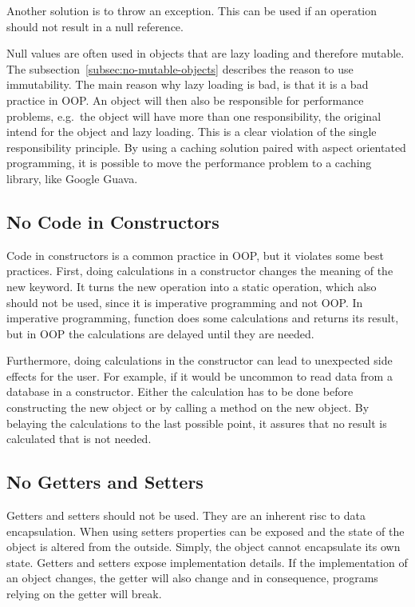 Another solution is to throw an exception.
This can be used if an operation should not result in a null reference.

Null values are often used in objects that are lazy loading and therefore mutable.
The subsection\ \ref{subsec:no-mutable-objects} describes the reason to use immutability.
The main reason why lazy loading is bad, is that it is a bad practice in \gls{OOP}.
An object will then also be responsible for performance problems, e.g.\ the object will have more than one responsibility,
the original intend for the object and lazy loading.
This is a clear violation of the single responsibility principle.
By using a caching solution paired with aspect orientated programming, it is possible to move the performance problem to a caching library, like Google Guava.\cite{elegant-objects}

\subsection{No Code in Constructors}\label{subsec:no-code-in-constructors}
Code in constructors is a common practice in \gls{OOP}, but it violates some best practices.
First, doing calculations in a constructor changes the meaning of the new keyword.
It turns the new operation into a static operation, which also should not be used, since it is imperative programming and not \gls{OOP}.
In imperative programming, function does some calculations and returns its result, but in \gls{OOP} the calculations are delayed until they are needed.

Furthermore, doing calculations in the constructor can lead to unexpected side effects for the user.
For example, if it would be uncommon to read data from a database in a constructor.
Either the calculation has to be done before constructing the new object or by calling a method on the new object.
By belaying the calculations to the last possible point, it assures that no result is calculated that is not needed.\cite{elegant-objects}

\subsection{No Getters and Setters}\label{subsec:no-getters-and-setters}
Getters and setters should not be used.
They are an inherent risc to data encapsulation.
When using setters properties can be exposed and the state of the object is altered from the outside.
Simply, the object cannot encapsulate its own state.\cite{encapsulation}
Getters and setters expose implementation details.
If the implementation of an object changes, the getter will also change and in consequence, programs relying on the getter will break.

